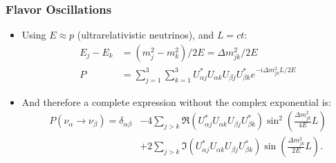 \documentclass[mathserif,18pt,xcolor=table]{beamer}
\begin{document}
\begin{frame}
  \frametitle{Flavor Oscillations}
  \begin{itemize}
  \item Using $E\approx p$ (ultrarelativistic neutrinos), and $L = ct$:
    \begin{align}
      E_j - E_k &= \left(m_j^2 - m_k^2\right)/2E = \Delta m_{jk}^2/2E \\
      P &= \sum_{j=1}^3\sum_{k=1}^3 U^*_{\alpha j}U_{\alpha k}U_{\beta j}U_{\beta k}^* e^{-i\Delta m_{jk}^2L/2E}
    \end{align}
  \item And therefore a complete expression without the complex exponential is:
    \begin{align}
        P(\nu_{\alpha}\rightarrow\nu_{\beta}) = \delta_{\alpha\beta} & - 4\sum_{j>k}\Re\left(U_{\alpha j}^*U_{\alpha k}U_{\beta j}U_{\beta k}^*\right)\sin^2\left(\frac{\Delta m_{jk}^2}{4E}L\right) \nonumber \\
  & + 2\sum_{j>k}\Im\left(U_{\alpha j}^*U_{\alpha k}U_{\beta j}U_{\beta k}^*\right)\sin\left(\frac{\Delta m_{jk}^2}{2E}L\right).
    \end{align}
  \end{itemize}
\end{frame}
\end{document}
